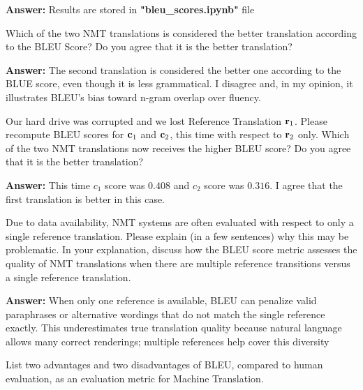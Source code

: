 \begin{parts}
\begin{subparts}
        {\color{red}
            \textbf{Answer:}
            Results are stored in \textbf{"bleu\_scores.ipynb"} file
        }
        \newline
        
        Which of the two NMT translations is considered the better translation according to the BLEU Score? Do you agree that it is the better translation?
        \newline

        {\color{red}
            \textbf{Answer:}
            The second translation is considered the better one according to the BLUE score, even though it is less grammatical. I disagree and, in my opinion, it illustrates BLEU’s bias toward n-gram overlap over fluency.
        }
        \newline
        
        \subpart[5] Our hard drive was corrupted and we lost Reference Translation $\mathbf{r}_1$. Please recompute BLEU scores for $\mathbf{c}_1$ and $\mathbf{c}_2$, this time with respect to $\mathbf{r}_2$ only. Which of the two NMT translations now receives the higher BLEU score? Do you agree that it is the better translation?
        \newline

        {\color{red}
            \textbf{Answer:}
            This time $c_1$ score was $0.408$ and $c_2$ score was $0.316$. I agree that the first translation is better in this case.
        }
        \newline
        
        \subpart[2] Due to data availability, NMT systems are often evaluated with respect to only a single reference translation. Please explain (in a few sentences) why this may be problematic. In your explanation, discuss how the BLEU score metric assesses the quality of NMT translations when there are multiple reference transitions versus a single reference translation.
        \newline

        {\color{red}
            \textbf{Answer:}
            When only one reference is available, BLEU can penalize valid paraphrases or alternative wordings that do not match the single reference exactly. This underestimates true translation quality because natural language allows many correct renderings; multiple references help cover this diversity
        }
        \newline
        
        \subpart[2] List two advantages and two disadvantages of BLEU, compared to human evaluation, as an evaluation metric for Machine Translation. 
        \newline


\end{subparts}
\end{parts}
